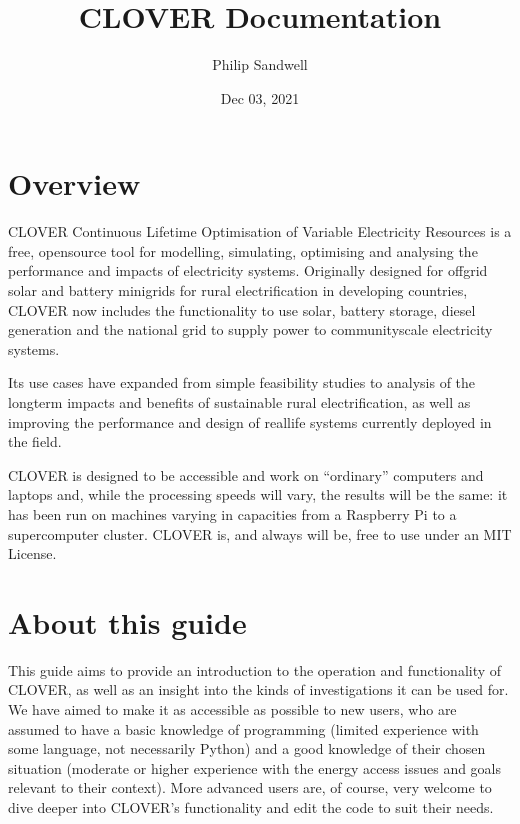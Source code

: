 \documentclass[letterpaper,10pt,english]{sphinxmanual}
\title{CLOVER Documentation}
\date{Dec 03, 2021}
\author{Philip Sandwell}
\begin{document}
\pagestyle{empty}
\sphinxmaketitle
\pagestyle{plain}
\sphinxtableofcontents
\pagestyle{normal}
\label{\detokenize{index::doc}}



\chapter{Overview}
\label{\detokenize{index:overview}}
\sphinxAtStartPar
CLOVER \sphinxhyphen{} Continuous Lifetime Optimisation of Variable Electricity Resources \sphinxhyphen{} is
a free, open\sphinxhyphen{}source tool for modelling, simulating, optimising and analysing the
performance and impacts of electricity systems. Originally designed for off\sphinxhyphen{}grid
solar and battery minigrids for rural electrification in developing
countries, CLOVER now includes the functionality to use solar, battery storage,
diesel generation and the national grid to supply power to community\sphinxhyphen{}scale
electricity systems.

\sphinxAtStartPar
Its use cases have expanded from simple feasibility studies
to analysis of the long\sphinxhyphen{}term impacts and benefits of sustainable rural
electrification, as well as improving the performance and design of real\sphinxhyphen{}life
systems currently deployed in the field.

\sphinxAtStartPar
CLOVER is designed to be accessible and work on “ordinary” computers and
laptops and, while the processing speeds will vary, the results will be the
same: it has been run on machines varying in capacities from a Raspberry Pi
to a supercomputer cluster. CLOVER is, and always will be, free to use under an
MIT License.


\chapter{About this guide}
\label{\detokenize{index:about-this-guide}}
\sphinxAtStartPar
This guide aims to provide an introduction to the operation and functionality
of CLOVER, as well as an insight into the kinds of investigations it can be
used for. We have aimed to make it as accessible as possible to new users, who
are assumed to have a basic knowledge of programming (limited experience with
some language, not necessarily Python) and a good knowledge of their chosen
situation (moderate or higher experience with the energy access issues and goals
relevant to their context). More advanced users are, of course, very welcome to
dive deeper into CLOVER’s functionality and edit the code to suit their needs.
\end{document}
